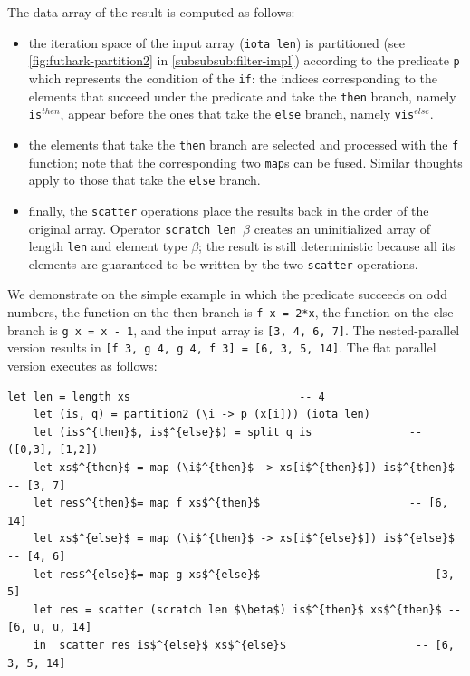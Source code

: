 \documentclass[acmsmall,review]{acmart}\settopmatter{printfolios=true,printccs=false,printacmref=false}
\begin{document}
The data array of the result is computed as follows:
\begin{itemize}
    \item the iteration space of the input array (\lstinline{iota len}) 
            is partitioned 
            (see \cref{fig:futhark-partition2} in \cref{subsubsub:filter-impl}) 
            according to the predicate {\tt p} which represents the 
            condition of the \lstinline{if}: the indices corresponding
            to the elements that succeed under the predicate and take the
            \lstinline{then} branch, namely {\tt is$^{then}$}, 
            appear before the ones that take the \lstinline{else}
            branch, namely {\tt vis$^{else}$}.
    \item the elements that take the \lstinline{then} branch are
            selected and processed with the {\tt f} function; note that
            the corresponding two \lstinline{map}s can be fused.
          Similar thoughts apply to those that take the \lstinline{else}
            branch.
    \item finally, the \lstinline{scatter} operations place the results
            back in the order of the original array. Operator 
            {\tt scratch len $\beta$} creates an uninitialized array of 
            length {\tt len} and element type $\beta$; the result is still 
            deterministic because 
            all its elements are guaranteed to be written by the two 
            \lstinline{scatter} operations.
\end{itemize}
 
We demonstrate on the simple example in which the predicate succeeds on
odd numbers, the function on the then branch is {\tt f x = 2*x}, the
function on the else branch is {\tt g x = x - 1}, and the input array 
is {\tt [3, 4, 6, 7]}. The nested-parallel version results in
{\tt [f 3, g 4, g 4, f 3] = [6, 3, 5, 14]}.
%
The flat parallel version executes as follows:
\begin{lstlisting}[mathescape=true]
    let len = length xs                          -- 4
    let (is, q) = partition2 (\i -> p (x[i])) (iota len)
    let (is$^{then}$, is$^{else}$) = split q is               -- ([0,3], [1,2])
    let xs$^{then}$ = map (\i$^{then}$ -> xs[i$^{then}$]) is$^{then}$     -- [3, 7]
    let res$^{then}$= map f xs$^{then}$                       -- [6, 14]
    let xs$^{else}$ = map (\i$^{then}$ -> xs[i$^{else}$]) is$^{else}$      -- [4, 6]
    let res$^{else}$= map g xs$^{else}$                        -- [3, 5]
    let res = scatter (scratch len $\beta$) is$^{then}$ xs$^{then}$ -- [6, u, u, 14]
    in  scatter res is$^{else}$ xs$^{else}$                    -- [6, 3, 5, 14]
\end{lstlisting}\vspace{-2ex}
\end{document}
